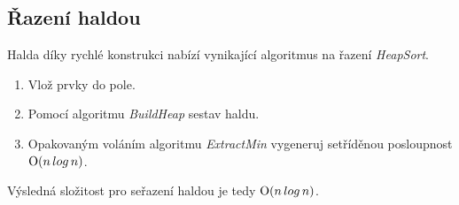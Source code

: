     \subsection{Řazení haldou}
      Halda díky rychlé konstrukci nabízí vynikající algoritmus na řazení \emph{HeapSort}.

      \begin{enumerate}
        \item Vlož prvky do pole.
        \item Pomocí algoritmu \emph{BuildHeap} sestav haldu.
        \item Opakovaným voláním algoritmu \emph{ExtractMin} vygeneruj setříděnou posloupnost $\textrm O(n \, log \, n)$.
      \end{enumerate}

      Výsledná složitost pro seřazení haldou je tedy $\textrm O(n \, log \, n)$.
